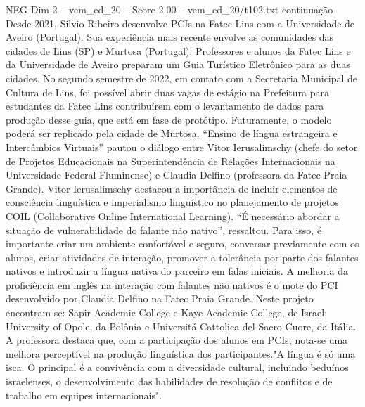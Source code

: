 \begin{textsample}{NEG Dim 2 – vem\_ed\_20 – Score 2.00 – vem\_ed\_20/t102.txt}  \label{ex:f2_neg_086}
continuação Desde 2021, Silvio Ribeiro desenvolve PCIs na Fatec Lins com a Universidade de Aveiro (Portugal).
Sua experiência mais recente envolve as comunidades das cidades de Lins (SP) e Murtosa (Portugal).
Professores e alunos da Fatec Lins e da Universidade de Aveiro preparam um Guia Turístico Eletrônico para as duas cidades.
No segundo semestre de 2022, em contato com a Secretaria Municipal de Cultura de Lins, foi possível abrir duas vagas de estágio na Prefeitura para estudantes da Fatec Lins contribuírem com o levantamento de dados para produção desse guia, que está em fase de protótipo.
Futuramente, o modelo poderá ser replicado pela cidade de Murtosa. “Ensino de língua estrangeira e Intercâmbios Virtuais” pautou o diálogo entre Vitor Ierusalimschy (chefe do setor de Projetos Educacionais na Superintendência de Relações Internacionais na Universidade Federal Fluminense) e Claudia Delfino (professora da Fatec Praia Grande).
Vitor Ierusalimschy destacou a importância de incluir elementos de consciência linguística e imperialismo linguístico no planejamento de projetos COIL (Collaborative Online International Learning). “É necessário abordar a situação de vulnerabilidade do falante não nativo”, ressaltou.
Para isso, é importante criar um ambiente confortável e seguro, conversar previamente com os alunos, criar atividades de interação, promover a tolerância por parte dos falantes nativos e introduzir a língua nativa do parceiro em falas iniciais.
A melhoria da proficiência em inglês na interação com falantes não nativos é o mote do PCI desenvolvido por Claudia Delfino na Fatec Praia Grande.
Neste projeto encontram-se: Sapir Academic College e Kaye Academic College, de Israel; University of Opole, da Polônia e Universitá Cattolica del Sacro Cuore, da Itália.
A professora destaca que, com a participação dos alunos em PCIs, nota-se uma melhora perceptível na produção linguística dos participantes."A língua é só uma isca.
O principal é a convivência com a diversidade cultural, incluindo beduínos israelenses, o desenvolvimento das habilidades de resolução de conflitos e de trabalho em equipes internacionais".

\end{textsample}
